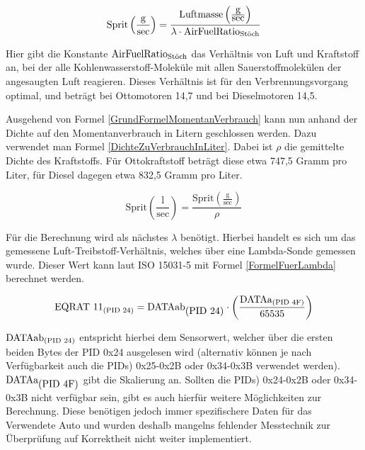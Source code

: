 \begin{equation}
\label{GrundFormelMomentanVerbrauch}
\mbox{Sprit}\left(\frac{\mbox{g}}{\mbox{sec}}\right) = \frac{\mbox{Luftmasse}\left(\frac{\mbox{g}}{\mbox{sec}}\right)}{\lambda \cdot \mbox{AirFuelRatio}_\text{\mbox{Stöch}}}
\end{equation}

Hier gibt die Konstante $\mbox{AirFuelRatio}_\text{\mbox{Stöch}}$ das Verhältnis von Luft und Kraftstoff an, bei der alle
Kohlenwasserstoff-Moleküle mit allen Sauerstoffmolekülen der angesaugten Luft reagieren. Dieses
Verhältnis ist für den Verbrennungsvorgang optimal, und beträgt bei Ottomotoren 14,7 und bei
Dieselmotoren 14,5.

Ausgehend von Formel \ref{GrundFormelMomentanVerbrauch} kann nun anhand der Dichte auf den Momentanverbrauch in Litern geschlossen werden. Dazu verwendet man Formel \ref{DichteZuVerbrauchInLiter}. Dabei ist $\rho$ die gemittelte Dichte des Kraftstoffs. Für Ottokraftstoff beträgt diese etwa 747,5
Gramm pro Liter, für Diesel dagegen etwa 832,5 Gramm pro Liter\cite{Aral2018}. 

\begin{equation}
\label{DichteZuVerbrauchInLiter}
\mbox{Sprit}\left(\frac{\mbox{l}}{\mbox{sec}}\right) = \frac{\mbox{Sprit}\left(\frac{\mbox{g}}{\mbox{sec}}\right)}{\rho}
\end{equation}
 
Für die Berechnung wird als nächstes $\lambda$ benötigt. Hierbei handelt es sich um das gemessene Luft-Treibstoff-Verhältnis, welches über eine Lambda-Sonde gemessen wurde. Dieser Wert kann laut ISO 15031-5 mit Formel \ref{FormelFuerLambda} berechnet werden.

\begin{equation}
\label{FormelFuerLambda}
\mbox{EQRAT 11}_\text{\mbox{(PID 24)}}=\mbox{DATAab}_{\mbox{(\text{PID 24})}} \cdot \left(\frac{\mbox{DATAa}_{(\text{\mbox{PID 4F}})}}{65535}\right)
\end{equation}

$\mbox{DATAab}_{\text{\mbox{(PID 24)}}}$ entspricht hierbei dem Sensorwert, welcher über die ersten beiden Bytes der \ac{PID} 0x24 ausgelesen wird (alternativ können je nach Verfügbarkeit auch die \acp{PID}) 0x25-0x2B oder 0x34-0x3B verwendet werden).
\newline
$\mbox{DATAa}_{\mbox{(\text{PID 4F})}}$ gibt die Skalierung an.
\newline
Sollten die \acp{PID}) 0x24-0x2B oder 0x34-0x3B nicht verfügbar sein, gibt es auch hierfür weitere Möglichkeiten zur Berechnung. Diese benötigen jedoch immer spezifischere Daten für das Verwendete Auto und wurden deshalb mangelns fehlender Messtechnik zur Überprüfung auf Korrektheit nicht weiter implementiert.


